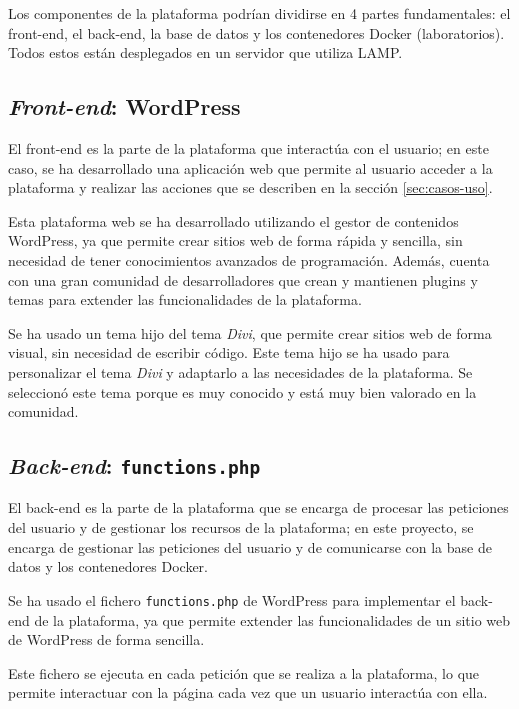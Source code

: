         Los componentes de la plataforma podrían dividirse en 4 partes fundamentales: el front-end, el back-end, la base de datos y los contenedores Docker (laboratorios). Todos estos están desplegados en un servidor que utiliza LAMP.

        \subsection{\textit{Front-end}: WordPress}

            El front-end es la parte de la plataforma que interactúa con el usuario; en este caso, se ha desarrollado una aplicación web que permite al usuario acceder a la plataforma y realizar las acciones que se describen en la sección \ref{sec:casos-uso}.
            
            Esta plataforma web se ha desarrollado utilizando el gestor de contenidos WordPress, ya que permite crear sitios web de forma rápida y sencilla, sin necesidad de tener conocimientos avanzados de programación. Además, cuenta con una gran comunidad de desarrolladores que crean y mantienen plugins y temas para extender las funcionalidades de la plataforma.

            Se ha usado un tema hijo del tema \textit{Divi}, que permite crear sitios web de forma visual, sin necesidad de escribir código. Este tema hijo se ha usado para personalizar el tema \textit{Divi} y adaptarlo a las necesidades de la plataforma. Se seleccionó este tema porque es muy conocido y está muy bien valorado en la comunidad.

        \subsection{\textit{Back-end}: \texttt{functions.php}}
        
            El back-end es la parte de la plataforma que se encarga de procesar las peticiones del usuario y de gestionar los recursos de la plataforma; en este proyecto, se encarga de gestionar las peticiones del usuario y de comunicarse con la base de datos y los contenedores Docker.
            
            Se ha usado el fichero \texttt{functions.php} de WordPress para implementar el back-end de la plataforma, ya que permite extender las funcionalidades de un sitio web de WordPress de forma sencilla.
            
            Este fichero se ejecuta en cada petición que se realiza a la plataforma, lo que permite interactuar con la página cada vez que un usuario interactúa con ella.

